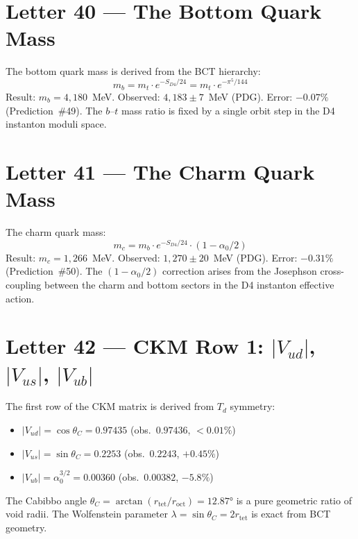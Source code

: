 \documentclass[aps,prl,twocolumn,showpacs,preprintnumbers]{revtex4-2}
\newcommand{\roct}{r_{\mathrm{oct}}}
\newcommand{\rtet}{r_{\mathrm{tet}}}
\begin{document}
\section{Letter 40 --- The Bottom Quark Mass}

\medskip
The bottom quark mass is derived from the BCT hierarchy:
\begin{equation}
m_b = m_t \cdot e^{-S_{D4}/24} = m_t \cdot e^{-\pi^5/144}
\end{equation}
Result: $m_b = 4{,}180$~MeV. Observed: $4{,}183 \pm 7$~MeV (PDG).
Error: $-0.07\%$ (Prediction~\#49). The $b$--$t$ mass ratio is
fixed by a single orbit step in the D4 instanton moduli space.

\section{Letter 41 --- The Charm Quark Mass}

\medskip
The charm quark mass:
\begin{equation}
m_c = m_b \cdot e^{-S_{D4}/24} \cdot (1 - \alpha_0/2)
\end{equation}
Result: $m_c = 1{,}266$~MeV. Observed: $1{,}270 \pm 20$~MeV (PDG).
Error: $-0.31\%$ (Prediction~\#50). The $(1-\alpha_0/2)$ correction
arises from the Josephson cross-coupling between the charm and bottom
sectors in the D4 instanton effective action.

\section{Letter 42 --- CKM Row 1: $|V_{ud}|$, $|V_{us}|$, $|V_{ub}|$}

\medskip
The first row of the CKM matrix is derived from $T_d$ symmetry:
\begin{itemize}
  \item $|V_{ud}| = \cos\theta_C = 0.97435$ (obs.\ $0.97436$, $<0.01\%$)
  \item $|V_{us}| = \sin\theta_C = 0.2253$ (obs.\ $0.2243$, $+0.45\%$)
  \item $|V_{ub}| = \alpha_0^{3/2} = 0.00360$ (obs.\ $0.00382$, $-5.8\%$)
\end{itemize}
The Cabibbo angle $\theta_C = \arctan(\rtet/\roct) = 12.87°$ is a
pure geometric ratio of void radii. The Wolfenstein parameter
$\lambda = \sin\theta_C = 2\rtet$ is exact from BCT geometry.
\end{document}
